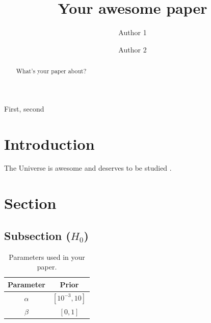\documentclass{openjournal}
\begin{document}
\title{Your awesome paper}


\author{Author 1}

\author{Author 2}



\begin{abstract}
    What's your paper about?
    \lipsum[50]
\end{abstract}

\begin{keywords}
    {First, second}
\end{keywords}

\maketitle


\section{Introduction}
\label{sec:intro}

The Universe is awesome and deserves to be studied \cite{me}.

\lipsum[10]


\section{Section}
\label{sec:sec}

\lipsum[12]

\subsection{Subsection  (\texorpdfstring{$ H_0 $}{})}

\begingroup %
    \setlength{\tabcolsep}{10pt} %
    \renewcommand{\arraystretch}{1.5} %
    \setlength\extrarowheight{2pt}
    \begin{table}
        \centering
        \begin{tabular}{ c c }  
            Parameter & Prior \\
            \hline \hline     
            {\boldmath$\alpha$} & $\left[ 10^{-3}, 10 \right]$ \\
            {\boldmath$\beta$} & $\left[ 0, 1 \right]$ \\   
            \hline \hline  
        \end{tabular}  
        \caption{Parameters used in your paper.}
        \label{table:table}
    \end{table}
\endgroup
\end{document}
